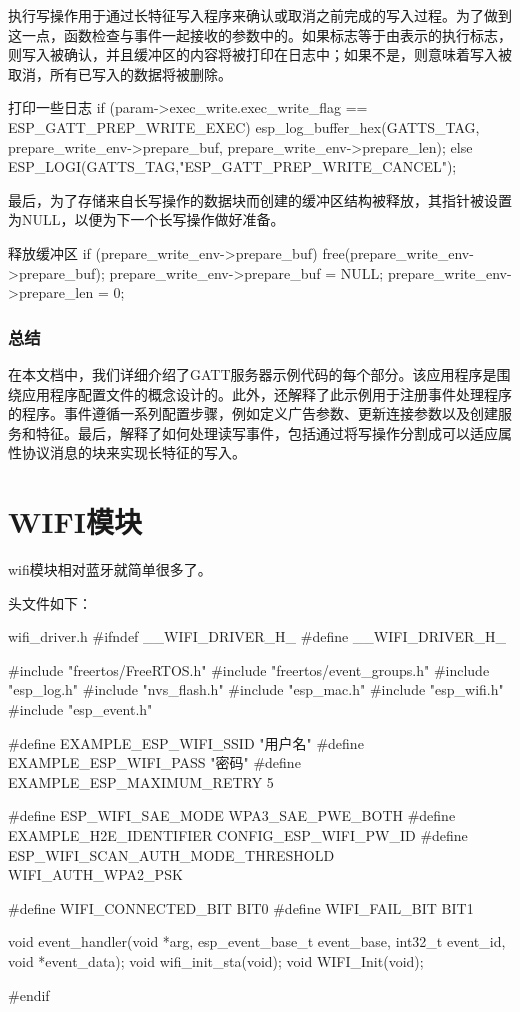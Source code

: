 \documentclass[lang=cn,newtx,10pt,scheme=chinese]{elegantbook}
\begin{document}
执行写操作用于通过长特征写入程序来确认或取消之前完成的写入过程。为了做到这一点，函数检查与事件一起接收的参数中的。如果标志等于由表示的执行标志，则写入被确认，并且缓冲区的内容将被打印在日志中；如果不是，则意味着写入被取消，所有已写入的数据将被删除。

\begin{mycode}{打印一些日志}
if (param->exec_write.exec_write_flag == ESP_GATT_PREP_WRITE_EXEC) {  
   esp_log_buffer_hex(GATTS_TAG,  
                      prepare_write_env->prepare_buf,  
                      prepare_write_env->prepare_len);
} else {
    ESP_LOGI(GATTS_TAG,"ESP_GATT_PREP_WRITE_CANCEL");
}
\end{mycode}

最后，为了存储来自长写操作的数据块而创建的缓冲区结构被释放，其指针被设置为NULL，以便为下一个长写操作做好准备。

\begin{mycode}{释放缓冲区}
if (prepare_write_env->prepare_buf) {
    free(prepare_write_env->prepare_buf);
    prepare_write_env->prepare_buf = NULL;
}
prepare_write_env->prepare_len = 0;
\end{mycode}

\subsection{总结}

在本文档中，我们详细介绍了GATT服务器示例代码的每个部分。该应用程序是围绕应用程序配置文件的概念设计的。此外，还解释了此示例用于注册事件处理程序的程序。事件遵循一系列配置步骤，例如定义广告参数、更新连接参数以及创建服务和特征。最后，解释了如何处理读写事件，包括通过将写操作分割成可以适应属性协议消息的块来实现长特征的写入。

\chapter{WIFI模块}

wifi模块相对蓝牙就简单很多了。

头文件如下：

\begin{mycode}{wifi\_driver.h}
#ifndef __WIFI_DRIVER_H_
#define __WIFI_DRIVER_H_

#include "freertos/FreeRTOS.h"
#include "freertos/event_groups.h"
#include "esp_log.h"
#include "nvs_flash.h"
#include "esp_mac.h"
#include "esp_wifi.h"
#include "esp_event.h"

#define EXAMPLE_ESP_WIFI_SSID "用户名"
#define EXAMPLE_ESP_WIFI_PASS "密码"
#define EXAMPLE_ESP_MAXIMUM_RETRY 5

#define ESP_WIFI_SAE_MODE WPA3_SAE_PWE_BOTH
#define EXAMPLE_H2E_IDENTIFIER CONFIG_ESP_WIFI_PW_ID
#define ESP_WIFI_SCAN_AUTH_MODE_THRESHOLD WIFI_AUTH_WPA2_PSK

#define WIFI_CONNECTED_BIT BIT0
#define WIFI_FAIL_BIT BIT1

void event_handler(void *arg, esp_event_base_t event_base,
                   int32_t event_id, void *event_data);
void wifi_init_sta(void);
void WIFI_Init(void);

#endif
\end{mycode}
\end{document}
